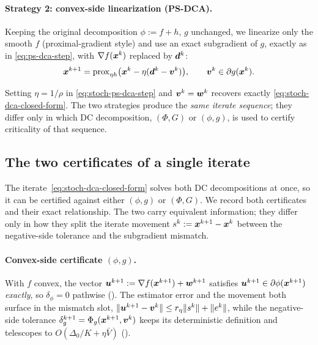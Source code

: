 \paragraph{Strategy 2: convex-side linearization (PS-DCA).}
Keeping the original decomposition $\phi:=f+h$, $g$ unchanged, we
linearize only the smooth $f$ (proximal-gradient style) and use an exact
subgradient of $g$, exactly as in \eqref{eq:ps-dca-step}, with
$\nabla f(\bm{x}^k)$ replaced by $\bm{d}^k$:
\begin{equation}
    \bm{x}^{k+1}
    =
    \mathrm{prox}_{\eta h}
    \bigl(
        \bm{x}^k-\eta(\bm{d}^k-\bm{v}^k)
    \bigr),
    \qquad
    \bm{v}^k\in\partial g(\bm{x}^k).
    \label{eq:stoch-ps-dca-step}
\end{equation}

\begin{remark}
Setting $\eta=1/\rho$ in \eqref{eq:stoch-ps-dca-step} and $\bm{v}^k=\bm{w}^k$
recovers exactly \eqref{eq:stoch-dca-closed-form}. The two strategies
produce the \emph{same iterate sequence}; they differ only in which DC
decomposition, $(\Phi,G)$ or $(\phi,g)$, is used to certify criticality
of that sequence.
\end{remark}

\subsection{The two certificates of a single iterate}
\label{subsec:cert-comparison}

The iterate~\eqref{eq:stoch-dca-closed-form} solves both DC
decompositions at once, so it can be certified against either $(\phi,g)$
or $(\Phi,G)$. We record both certificates and their exact relationship.
The two carry equivalent information; they differ only in how they split
the iterate movement $s^k:=\bm{x}^{k+1}-\bm{x}^k$ between the negative-side
tolerance and the subgradient mismatch.

\paragraph{Convex-side certificate $(\phi,g)$.} With $f$ convex, the
vector $\bm{u}^{k+1}:=\nabla f(\bm{x}^{k+1})+\bm{w}^{k+1}$ satisfies
$\bm{u}^{k+1}\in\partial\phi(\bm{x}^{k+1})$ \emph{exactly}, so $\delta_\phi=0$
pathwise (). The estimator error and
the movement both surface in the mismatch slot,
$\lVert \bm{u}^{k+1}-\bm{v}^k\rVert\le r_\eta\lVert s^k\rVert+\lVert e^k\rVert$, while the
negative-side tolerance $\delta_g^{k+1}=\Phi_g(\bm{x}^{k+1},\bm{v}^k)$ keeps its
deterministic definition and telescopes to $O(\Delta_0/K+\eta\bar V)$
().

